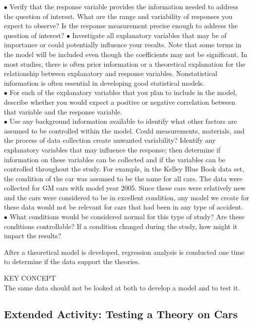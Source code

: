\documentclass[
]{report}
\theoremstyle{definition}
\theoremstyle{definition}
\theoremstyle{definition}
\theoremstyle{definition}
\theoremstyle{remark}
\begin{document}
\(\bullet\) Verify that the response variable provides the information needed to address the question of interest. What are the range and variability of responses you expect to observe? Is the response measurement precise enough to address the question of interest?
\(\bullet\) Investigate all explanatory variables that may be of importance or could potentially influence your results. Note that some terms in the model will be included even though the coefficients may not be significant. In most studies, there is often prior information or a theoretical explanation for the relationship between explanatory and response variables. Nonstatistical information is often essential in developing good statistical models.\\
\(\bullet\) For each of the explanatory variables that you plan to include in the model, describe whether you would expect a positive or negative correlation between that variable and the response variable.\\
\(\bullet\) Use any background information available to identify what other factors are assumed to be controlled within the model. Could measurements, materials, and the process of data collection create unwanted variability? Identify any explanatory variables that may influence the response; then determine if information on these variables can be collected and if the variables can be controlled throughout the study. For example, in the Kelley Blue Book data set, the condition of the car was assumed to be the same for all cars. The data were collected for GM cars with model year 2005. Since these cars were relatively new and the cars were considered to be in excellent condition, any model we create for these data would not be relevant for cars that had been in any type of accident.\\
\(\bullet\) What conditions would be considered normal for this type of study? Are these conditions controllable? If a condition changed during the study, how might it impact the results?

After a theoretical model is developed, regression analysis is conducted one time to determine if the data support the theories.

KEY CONCEPT\\
The same data should not be looked at both to develop a model and to test it.

\hypertarget{extended-activity-testing-a-theory-on-cars}{%
\subsection*{Extended Activity: Testing a Theory on Cars}\label{extended-activity-testing-a-theory-on-cars}}
\end{document}
